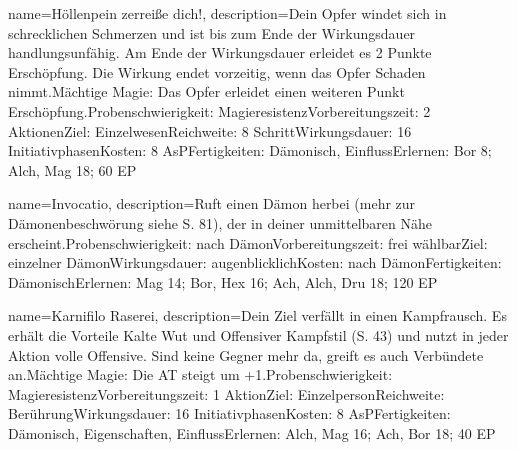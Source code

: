 {
    name={Höllenpein zerreiße dich!},
    description={Dein Opfer windet sich in schrecklichen Schmerzen und ist bis zum Ende der Wirkungsdauer handlungsunfähig. Am Ende der Wirkungsdauer erleidet es 2 Punkte Erschöpfung. Die Wirkung endet vorzeitig, wenn das Opfer Schaden nimmt.\newline Mächtige Magie: Das Opfer erleidet einen weiteren Punkt Erschöpfung.\newline Probenschwierigkeit: Magieresistenz\newline Vorbereitungszeit: 2 Aktionen\newline Ziel: Einzelwesen\newline Reichweite: 8 Schritt\newline Wirkungsdauer: 16 Initiativphasen\newline Kosten: 8 AsP\newline Fertigkeiten: Dämonisch, Einfluss\newline Erlernen: Bor 8; Alch, Mag 18; 60 EP}
}


{
    name={Invocatio},
    description={Ruft einen Dämon herbei (mehr zur Dämonenbeschwörung siehe S. 81), der in deiner unmittelbaren Nähe erscheint.\newline Probenschwierigkeit: nach Dämon\newline Vorbereitungszeit: frei wählbar\newline Ziel: einzelner Dämon\newline Wirkungsdauer: augenblicklich\newline Kosten: nach Dämon\newline Fertigkeiten: Dämonisch\newline Erlernen: Mag 14; Bor, Hex 16; Ach, Alch, Dru 18; 120 EP}
}


{
    name={Karnifilo Raserei},
    description={Dein Ziel verfällt in einen Kampfrausch. Es erhält die Vorteile Kalte Wut und Offensiver Kampfstil (S. 43) und nutzt in jeder Aktion volle Offensive. Sind keine Gegner mehr da, greift es auch Verbündete an.\newline Mächtige Magie: Die AT steigt um +1.\newline Probenschwierigkeit: Magieresistenz\newline Vorbereitungszeit: 1 Aktion\newline Ziel: Einzelperson\newline Reichweite: Berührung\newline Wirkungsdauer: 16 Initiativphasen\newline Kosten: 8 AsP\newline Fertigkeiten: Dämonisch, Eigenschaften, Einfluss\newline Erlernen: Alch, Mag 16; Ach, Bor 18; 40 EP}
}


